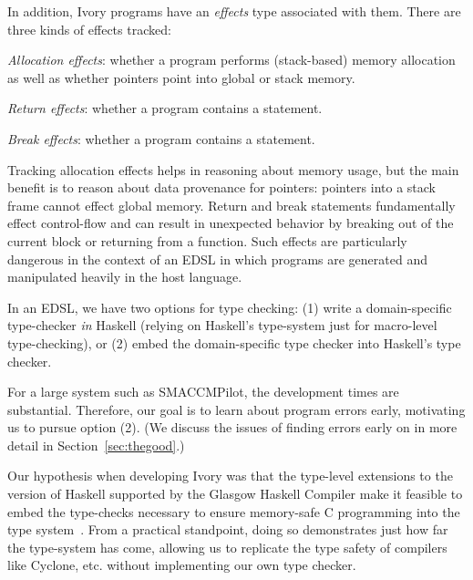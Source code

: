 In addition, Ivory programs have an \emph{effects} type associated with them.
There are three kinds of effects tracked:
\begin{compactitem}
  \item \emph{Allocation effects}: whether a program performs (stack-based)
    memory allocation as well as whether pointers point into global or stack memory.
  \item \emph{Return effects}: whether a program contains a  statement.
  \item \emph{Break effects}: whether a program contains a 
    statement.
\end{compactitem}
\noindent
Tracking allocation effects helps in reasoning about memory usage, but the main
benefit is to reason about data provenance for pointers: pointers into a stack
frame cannot effect global memory.  Return and break statements fundamentally
effect control-flow and can result in unexpected behavior by breaking out of the
current block or returning from a function.  Such effects are particularly
dangerous in the context of an EDSL in which programs are generated and
manipulated heavily in the host language.

In an EDSL, we have two options for type checking: (1) write a domain-specific
type-checker \emph{in} Haskell (relying on Haskell's type-system just for
macro-level type-checking), or (2) embed the domain-specific type checker into
Haskell's type checker.

For a large system such as SMACCMPilot, the development times are substantial.
Therefore, our goal is to learn about program errors early, motivating us to
pursue option (2).  (We discuss the issues of finding errors early on in more
detail in Section~\ref{sec:thegood}.)

Our hypothesis when developing Ivory was that the type-level extensions to the
version of Haskell supported by the Glasgow Haskell Compiler make it feasible to
embed the type-checks necessary to ensure memory-safe C programming into the
type system~\cite{dephaskell}.  From a practical standpoint, doing so
demonstrates just how far the type-system has come, allowing us to replicate the
type safety of compilers like Cyclone, etc. without implementing our own type
checker.


